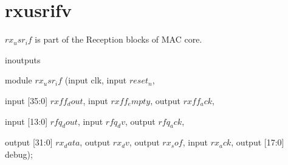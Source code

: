 \chapter{rxusrifv}

$rx_usr_if$ is part of the Reception blocks of MAC core.

\begin{chunk}{inoutputs}

module $rx_usr_if$
(input clk, input $reset_n$,

 input [35:0] $rxff_dout$,
 input $rxff_empty$,
 output $rxff_ack$,

 input [13:0] $rfq_dout$,
 input $rfq_dv$,
 output $rfq_ack$,

 output [31:0] $rx_data$,
 output $rx_dv$,
 output $rx_sof$,
 input $rx_ack$,
 output [17:0] debug);


\end{chunk}


